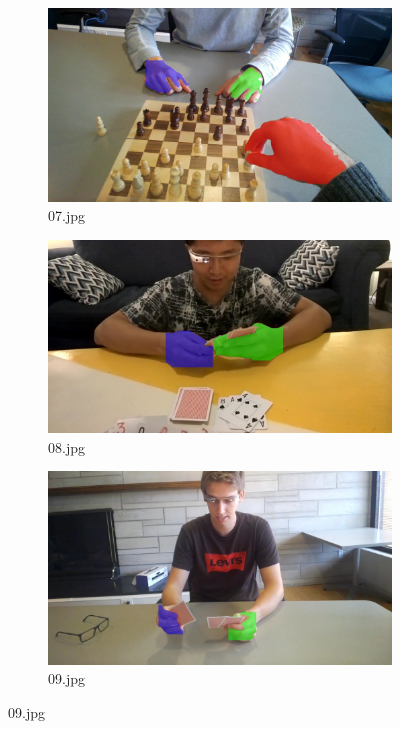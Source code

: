 \begin{figure}[!h]
\begin{subfigure}[b]{0.3\textwidth}
    \end{subfigure}
       
    \begin{subfigure}[b]{0.3 \textwidth}
        \centering
        \includegraphics[width=\textwidth]{images/handSegmentation/07.jpg}
        \caption{07.jpg}
        
    \end{subfigure}
    \hfill
    \begin{subfigure}[b]{0.3\textwidth}
        \centering
        \includegraphics[width=\textwidth]{images/handSegmentation/08.jpg}
        \caption{08.jpg}
       
    \end{subfigure}
    \hfill
    \begin{subfigure}[b]{0.3\textwidth}
        \centering
        \includegraphics[width=\textwidth]{images/handSegmentation/09.jpg}
        \caption{09.jpg}
        

\end{subfigure}
\end{figure}
